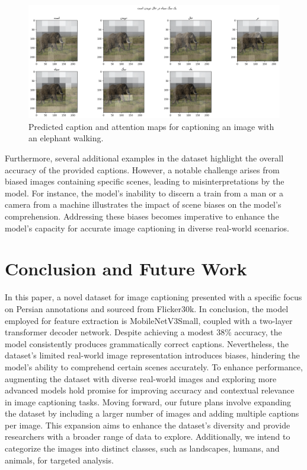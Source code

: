 \documentclass[runningheads]{llncs}
\begin{document}
\begin{figure}
  \includegraphics[width=\textwidth]{elephant.png}
  \caption{ Predicted caption and attention maps for captioning an image with an elephant walking.} \label{fig5}
\end{figure}

Furthermore, several additional examples in the dataset highlight the overall accuracy of the provided captions. However, a notable challenge arises from biased images containing specific scenes, leading to misinterpretations by the model. For instance, the model's inability to discern a train from a man or a camera from a machine illustrates the impact of scene biases on the model's comprehension. Addressing these biases becomes imperative to enhance the model's capacity for accurate image captioning in diverse real-world scenarios.

\section{Conclusion and Future Work}
In this paper, a novel dataset for image captioning presented with a specific focus on Persian annotations and sourced from Flicker30k.
In conclusion, the model employed for feature extraction is MobileNetV3Small, coupled with a two-layer transformer decoder network. Despite achieving a modest 38\% accuracy, the model consistently produces grammatically correct captions. Nevertheless, the dataset's limited real-world image representation introduces biases, hindering the model's ability to comprehend certain scenes accurately. To enhance performance, augmenting the dataset with diverse real-world images and exploring more advanced models hold promise for improving accuracy and contextual relevance in image captioning tasks.
Moving forward, our future plans involve expanding the dataset by including a larger number of images and adding multiple captions per image. This expansion aims to enhance the dataset's diversity and provide researchers with a broader range of data to explore. Additionally, we intend to categorize the images into distinct classes, such as landscapes, humans, and animals, for targeted analysis.
\end{document}
